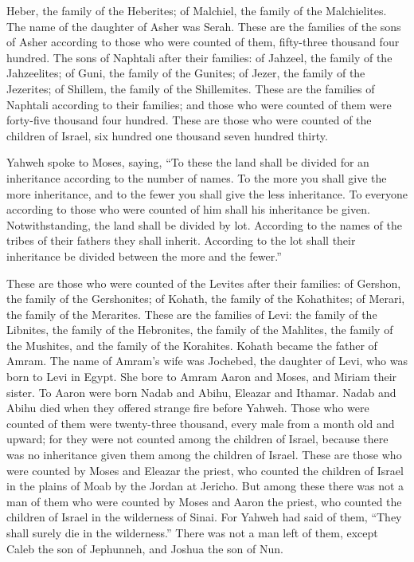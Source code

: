 Heber, the family of the Heberites; of Malchiel, the family of the
Malchielites.  The name of the daughter of Asher was Serah.
 These are the families of the sons of Asher according to
those who were counted of them, fifty-three thousand four hundred.
 The sons of Naphtali after their families: of Jahzeel, the
family of the Jahzeelites; of Guni, the family of the Gunites;
 of Jezer, the family of the Jezerites; of Shillem, the
family of the Shillemites.  These are the families of
Naphtali according to their families; and those who were counted of them
were forty-five thousand four hundred.  These are those who
were counted of the children of Israel, six hundred one thousand seven
hundred thirty.

 Yahweh spoke to Moses, saying,  ``To these
the land shall be divided for an inheritance according to the number of
names.  To the more you shall give the more inheritance,
and to the fewer you shall give the less inheritance. To everyone
according to those who were counted of him shall his inheritance be
given.  Notwithstanding, the land shall be divided by lot.
According to the names of the tribes of their fathers they shall
inherit.  According to the lot shall their inheritance be
divided between the more and the fewer.''

 These are those who were counted of the Levites after
their families: of Gershon, the family of the Gershonites; of Kohath,
the family of the Kohathites; of Merari, the family of the Merarites.
 These are the families of Levi: the family of the
Libnites, the family of the Hebronites, the family of the Mahlites, the
family of the Mushites, and the family of the Korahites. Kohath became
the father of Amram.  The name of Amram's wife was
Jochebed, the daughter of Levi, who was born to Levi in Egypt. She bore
to Amram Aaron and Moses, and Miriam their sister.  To
Aaron were born Nadab and Abihu, Eleazar and Ithamar. 
Nadab and Abihu died when they offered strange fire before Yahweh.
 Those who were counted of them were twenty-three thousand,
every male from a month old and upward; for they were not counted among
the children of Israel, because there was no inheritance given them
among the children of Israel.  These are those who were
counted by Moses and Eleazar the priest, who counted the children of
Israel in the plains of Moab by the Jordan at Jericho.  But
among these there was not a man of them who were counted by Moses and
Aaron the priest, who counted the children of Israel in the wilderness
of Sinai.  For Yahweh had said of them, ``They shall surely
die in the wilderness.'' There was not a man left of them, except Caleb
the son of Jephunneh, and Joshua the son of Nun.


